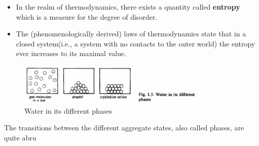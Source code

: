 \documentclass[10pt,aspectratio=43,mathserif,table]{beamer}
\begin{document}
\begin{frame}
    \begin{itemize}
        \item In the realm of thermodynamics, there exists a quantity called \textbf{entropy} which is a measure for the degree of disorder. 
        \item The (phenomenologically derived) laws of thermodynamics state that in a closed system(i.e., a system with no contacts to the outer world) the entropy ever increases to its maximal value.
    \end{itemize}

    \begin{figure}
        \centering
        \includegraphics[width=0.8\textwidth]{fig/fig1.5.png}
        \caption{Water in its different phases}
    \end{figure}

    The transitions between the different aggregate states, also called phases, are quite abru
\end{frame}



\end{document}
